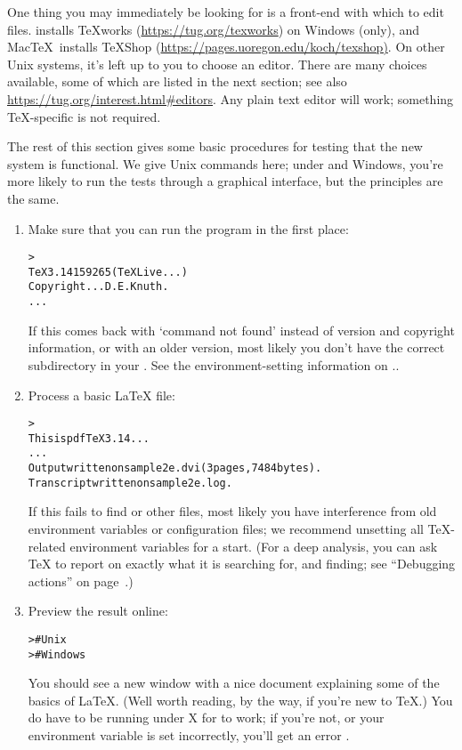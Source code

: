 \documentclass{article}
\begin{document}
One thing you may immediately be looking for is a front-end with which
to edit files.  \TL{} installs \TeX{}works
(\url{https://tug.org/texworks}) on Windows (only), and Mac\TeX\ installs
TeXShop (\url{https://pages.uoregon.edu/koch/texshop)}.  On other Unix
systems, it's left up to you to choose an editor.  There are many
choices available, some of which are listed in the next section; see
also \url{https://tug.org/interest.html#editors}.  Any plain text editor
will work; something \TeX-specific is not required.

The rest of this section gives some basic procedures for testing that
the new system is functional.  We give Unix commands here; under
\MacOSX{} and Windows, you're more likely to run the tests through a
graphical interface, but the principles are the same.

\begin{enumerate}

\item Make sure that you can run the  program in the first
place:
\begin{alltt}
> 
TeX 3.14159265 (TeX Live ...)
Copyright ... D.E. Knuth.
...
\end{alltt}
If this comes back with `command not found' instead of version and
copyright information, or with an older version, most likely you don't
have the correct  subdirectory in your .  See
the environment-setting information on \p.\pageref{sec:env}.

\item Process a basic \LaTeX{} file:
\begin{alltt}
> 
This is pdfTeX 3.14...
...
Output written on sample2e.dvi (3 pages, 7484 bytes).
Transcript written on sample2e.log.
\end{alltt}
If this fails to find  or other files, most
likely you have interference from old environment variables or
configuration files; we recommend unsetting all \TeX-related environment
variables for a start.  (For a deep analysis, you can ask \TeX{} to
report on exactly what it is searching for, and finding; see ``Debugging
actions'' on page~\pageref{sec:debugging}.)

\item Preview the result online:
\begin{alltt}
>     # Unix
>   # Windows
\end{alltt}
You should see a new window with a nice document explaining some of the
basics of \LaTeX{}.  (Well worth reading, by the way, if you're new to
\TeX.)  You do have to be running under X for  to work; if
you're not, or your  environment variable is set
incorrectly, you'll get an error .


\end{enumerate}
\end{document}
